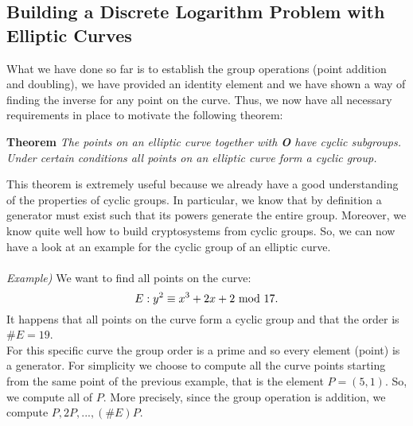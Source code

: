 \subsection{Building a Discrete Logarithm Problem with Elliptic Curves}
What we have done so far is to establish the group operations (point addition and doubling), we have provided an identity element and we have shown a way of finding the inverse for any point on the curve. Thus, we now have all necessary requirements in place to motivate the following theorem:
\begin{framed}
    \hfill\break\textbf{Theorem} \textit{The points on an elliptic curve together with \textbf{O} have cyclic subgroups. Under certain conditions all points on an elliptic curve form a cyclic group.}
\end{framed}
This theorem is extremely useful because we already have a good understanding of the properties of cyclic groups. In particular, we know that by definition a generator must exist such that its powers generate the entire group. Moreover, we know quite well how to build cryptosystems from cyclic groups. So, we can now have a look at an example for the cyclic group of an elliptic curve.\\\\
\textit{Example)} We want to find all points on the curve:$$E:y^2\equiv x^3+2x+2\text{ mod }17.$$
It happens that all points on the curve form a cyclic group and that the order is $\#E=19$.\\
For this specific curve the group order is a prime and so every element (point) is a generator. For simplicity we choose to compute all the curve points starting from the same point of the previous example, that is the element $P=(5,1)$. So, we compute all  of $P$. More precisely, since the group operation is addition, we compute $P,2P,...,(\#E)P$.

